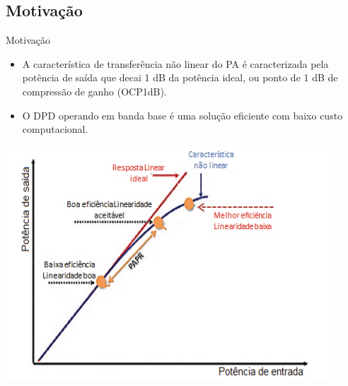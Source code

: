 \documentclass{if-beamer}
\begin{document}
\subsection{Motivação}
\begin{frame}{Motivação}
	
	\begin{minipage}{.49\textwidth}
		
		\begin{itemize}
			\item A característica de transferência não linear do PA é caracterizada pela potência de saída que decai 1 dB da potência ideal, ou ponto de 1 dB de compressão de ganho (OCP1dB).
			\item  O DPD operando em banda base é uma solução eficiente com baixo custo computacional.
		
		\end{itemize}
		
		
	\end{minipage}
	\begin{minipage}{.49\textwidth}
		\includegraphics[scale=0.5]{curvasaidaparf.png}
	\end{minipage}
	
\end{frame}


\end{document}
